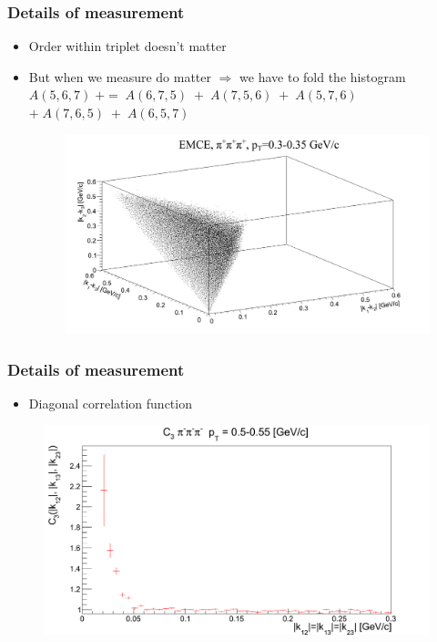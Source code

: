 \documentclass{beamer}
\begin{document}
\begin{frame}
\frametitle{Details of measurement}
\begin{itemize}
\setlength{\itemsep}{16pt}
\item Order within triplet doesn't matter
\item But when we measure do matter $\Rightarrow$ we have to fold the histogram
		$A(5,6,7) \;+=\; A(6,7,5)\; + \;A(7,5,6)\; + \;A(5,7,6)\; $ $+ \;A(7,6,5)\;+\;A(6,5,7)$
\begin{figure}
\includegraphics[scale=0.25]{pic/C2}
\end{figure}
\end{itemize}
\end{frame}

\begin{frame}
\frametitle{Details of measurement}
\begin{itemize}
\setlength{\itemsep}{16pt}
\item Diagonal correlation function
\end{itemize}
\begin{figure}
\includegraphics[scale=0.25]{pic/C31}
\end{figure}
\end{frame}
\end{document}

